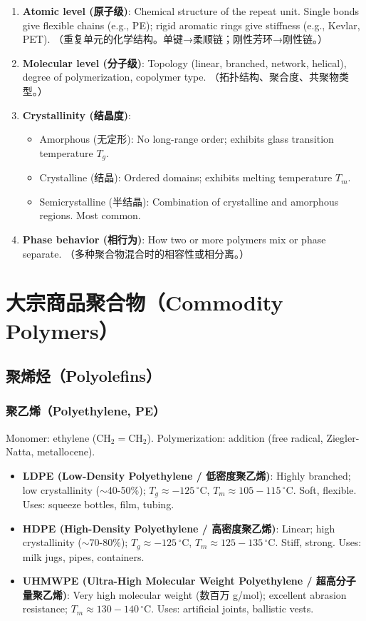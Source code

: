 \documentclass[12pt,a4paper]{ctexart}
\begin{document}
\begin{enumerate}[leftmargin=*]
    \item \textbf{Atomic level (原子级)}: Chemical structure of the repeat unit. Single bonds give flexible chains (e.g., PE); rigid aromatic rings give stiffness (e.g., Kevlar, PET). （重复单元的化学结构。单键→柔顺链；刚性芳环→刚性链。）
    \item \textbf{Molecular level (分子级)}: Topology (linear, branched, network, helical), degree of polymerization, copolymer type. （拓扑结构、聚合度、共聚物类型。）
    \item \textbf{Crystallinity (结晶度)}: 
        \begin{itemize}
            \item Amorphous (无定形): No long-range order; exhibits glass transition temperature $T_g$.
            \item Crystalline (结晶): Ordered domains; exhibits melting temperature $T_m$.
            \item Semicrystalline (半结晶): Combination of crystalline and amorphous regions. Most common.
        \end{itemize}
    \item \textbf{Phase behavior (相行为)}: How two or more polymers mix or phase separate. （多种聚合物混合时的相容性或相分离。）
\end{enumerate}

\section{大宗商品聚合物（Commodity Polymers）}

\subsection{聚烯烃（Polyolefins）}
\subsubsection{聚乙烯（Polyethylene, PE）}
Monomer: ethylene ($\mathrm{CH_2=CH_2}$). Polymerization: addition (free radical, Ziegler-Natta, metallocene).
\begin{itemize}[leftmargin=*]
    \item \textbf{LDPE (Low-Density Polyethylene / 低密度聚乙烯)}: Highly branched; low crystallinity ($\sim$40-50\%); $T_g \approx -125\,^\circ$C, $T_m \approx 105-115\,^\circ$C. Soft, flexible. Uses: squeeze bottles, film, tubing.
    \item \textbf{HDPE (High-Density Polyethylene / 高密度聚乙烯)}: Linear; high crystallinity ($\sim$70-80\%); $T_g \approx -125\,^\circ$C, $T_m \approx 125-135\,^\circ$C. Stiff, strong. Uses: milk jugs, pipes, containers.
    \item \textbf{UHMWPE (Ultra-High Molecular Weight Polyethylene / 超高分子量聚乙烯)}: Very high molecular weight (数百万 g/mol); excellent abrasion resistance; $T_m \approx 130-140\,^\circ$C. Uses: artificial joints, ballistic vests.
\end{itemize}
\end{document}
